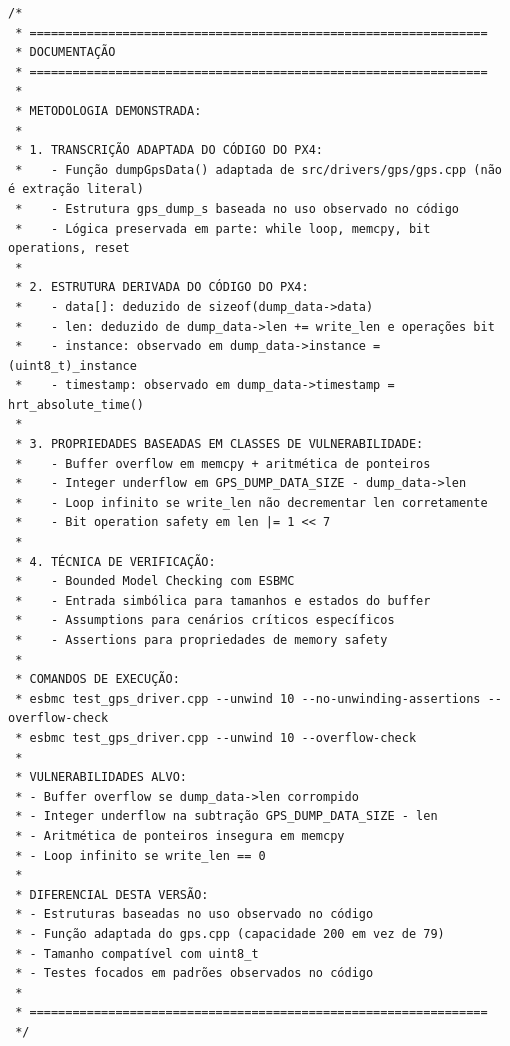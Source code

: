 \begin{lstlisting}
/* 
 * ================================================================
 * DOCUMENTAÇÃO
 * ================================================================
 * 
 * METODOLOGIA DEMONSTRADA:
 * 
 * 1. TRANSCRIÇÃO ADAPTADA DO CÓDIGO DO PX4:
 *    - Função dumpGpsData() adaptada de src/drivers/gps/gps.cpp (não é extração literal)
 *    - Estrutura gps_dump_s baseada no uso observado no código
 *    - Lógica preservada em parte: while loop, memcpy, bit operations, reset
 * 
 * 2. ESTRUTURA DERIVADA DO CÓDIGO DO PX4:
 *    - data[]: deduzido de sizeof(dump_data->data) 
 *    - len: deduzido de dump_data->len += write_len e operações bit
 *    - instance: observado em dump_data->instance = (uint8_t)_instance
 *    - timestamp: observado em dump_data->timestamp = hrt_absolute_time()
 * 
 * 3. PROPRIEDADES BASEADAS EM CLASSES DE VULNERABILIDADE:
 *    - Buffer overflow em memcpy + aritmética de ponteiros
 *    - Integer underflow em GPS_DUMP_DATA_SIZE - dump_data->len
 *    - Loop infinito se write_len não decrementar len corretamente
 *    - Bit operation safety em len |= 1 << 7
 * 
 * 4. TÉCNICA DE VERIFICAÇÃO:
 *    - Bounded Model Checking com ESBMC
 *    - Entrada simbólica para tamanhos e estados do buffer
 *    - Assumptions para cenários críticos específicos
 *    - Assertions para propriedades de memory safety
 * 
 * COMANDOS DE EXECUÇÃO:
 * esbmc test_gps_driver.cpp --unwind 10 --no-unwinding-assertions --overflow-check
 * esbmc test_gps_driver.cpp --unwind 10 --overflow-check
 * 
 * VULNERABILIDADES ALVO:
 * - Buffer overflow se dump_data->len corrompido
 * - Integer underflow na subtração GPS_DUMP_DATA_SIZE - len
 * - Aritmética de ponteiros insegura em memcpy
 * - Loop infinito se write_len == 0
 * 
 * DIFERENCIAL DESTA VERSÃO:
 * - Estruturas baseadas no uso observado no código
 * - Função adaptada do gps.cpp (capacidade 200 em vez de 79)
 * - Tamanho compatível com uint8_t
 * - Testes focados em padrões observados no código
 * 
 * ================================================================
 */
\end{lstlisting}


